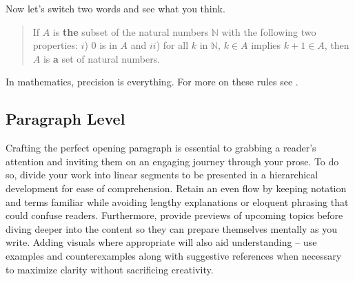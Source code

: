 \documentclass[
  twoside,
  12pt,
  letterpaper,
  fleqn]{article}
\begin{document}
Now let's switch two words and see what you think.

\begin{quote}
If \(A\) is \textbf{the} subset of the natural numbers \(\mathbb{N}\)
with the following two properties: \(i\)) 0 is in \(A\) and \(ii\)) for
all \(k\) in \(\mathbb{N}\), \(k\in A\) implies \(k+1\in A\), then \(A\)
is \textbf{a} set of natural numbers.
\end{quote}

In mathematics, precision is everything. For more on these rules see
\textcite{knuth1989mathematical}.

\hypertarget{paragraph-level}{%
\subsection{Paragraph Level}\label{paragraph-level}}

Crafting the perfect opening paragraph is essential to grabbing a
reader's attention and inviting them on an engaging journey through your
prose. To do so, divide your work into linear segments to be presented
in a hierarchical development for ease of comprehension. Retain an even
flow by keeping notation and terms familiar while avoiding lengthy
explanations or eloquent phrasing that could confuse readers.
Furthermore, provide previews of upcoming topics before diving deeper
into the content so they can prepare themselves mentally as you write.
Adding visuals where appropriate will also aid understanding -- use
examples and counterexamples along with suggestive references when
necessary to maximize clarity without sacrificing creativity.
\end{document}
